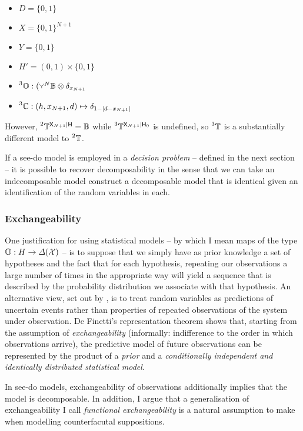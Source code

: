 \begin{itemize}
    \item $D=\{0,1\}$
    \item $X=\{0,1\}^{N+1}$
    \item $Y=\{0,1\}$
    \item $H'=(0,1)\times\{0,1\}$
    \item $\prescript{3}{}{\kernel{O}}:(\splitter{0.1}^N\kernel{B}\otimes \delta_{x_{N+1}}$
    \item $\prescript{3}{}{\ensuremath{\mathbb{C}}}:(h,x_{N+1},d)\mapsto \delta_{1-|d-x_{N+1}|}$
\end{itemize}

However, $\prescript{2}{}{\ensuremath{\mathbb{T}}}^{\mathsf{X}_{N+1}|\mathsf{H}} = \mathbb{B}$ while $\prescript{3}{}{\ensuremath{\mathbb{T}}}^{\mathsf{X}_{N+1}|\mathsf{H}_0}$ is undefined, so $\prescript{3}{}{\ensuremath{\mathbb{T}}}$ is a substantially different model to $\prescript{2}{}{\ensuremath{\mathbb{T}}}$.

If a see-do model is employed in a \emph{decision problem} -- defined in the next section -- it is possible to recover decomposability in the sense that we can take an indecomposable model construct a decomposable model that is identical given an identification of the random variables in each.

\subsubsection{Exchangeability}

One justification for using statistical models -- by which I mean maps of the type $\mathbb{O}:H\to \Delta(\mathcal{X})$ -- is to suppose that we simply have as prior knowledge a set of hypotheses and the fact that for each hypothesis, repeating our observations a large number of times in the appropriate way will yield a sequence that is described by the probability distribution we associate with that hypothesis. An alternative view, set out by \citet{de_finetti_foresight_1992}, is to treat random variables as predictions of uncertain events rather than properties of repeated observations of the system under observation. De Finetti's representation theorem shows that, starting from the assumption of \emph{exchangeability} (informally: indifference to the order in which observations arrive), the predictive model of future observations can be represented by the product of a \emph{prior} and a \emph{conditionally independent and identically distributed statistical model}.

In see-do models, exchangeability of observations additionally implies that the model is decomposable. In addition, I argue that a generalisation of exchangeability I call \emph{functional exchangeability} is a natural assumption to make when modelling counterfacutal suppositions.

